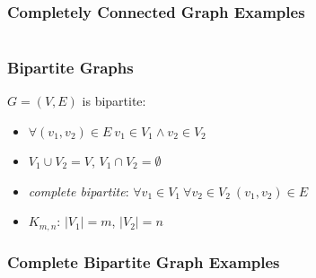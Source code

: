 \documentclass[dvipsnames]{beamer}
\begin{document}
\begin{frame}
  \frametitle{Completely Connected Graph Examples}

  \begin{columns}
    \begin{example}[$K_4$]
      \begin{center}
      \end{center}
    \end{example}

    \begin{example}[$K_5$]
      \begin{center}
      \end{center}
    \end{example}
  \end{columns}
\end{frame}

\begin{frame}
  \frametitle{Bipartite Graphs}

  \begin{definition}
    $G=(V,E)$ is \alert{bipartite}:
    \begin{itemize}
      \item $\forall (v_1,v_2) \in E~v_1 \in V_1 \wedge v_2 \in V_2$
      \item $V_1 \cup V_2 = V$, $V_1 \cap V_2 = \emptyset$
    \end{itemize}
  \end{definition}

  \pause
  \begin{itemize}
    \item \emph{complete bipartite}:
      $\forall v_1 \in V_1~\forall v_2 \in V_2~(v_1,v_2) \in E$
    \item $K_{m,n}$: $|V_1|=m$, $|V_2|=n$
  \end{itemize}
\end{frame}

\begin{frame}
  \frametitle{Complete Bipartite Graph Examples}

  \begin{columns}[t]
    \begin{example}[$K_{2,3}$]
      \begin{center}
      \end{center}
    \end{example}

    \begin{example}[$K_{3,3}$]
      \begin{center}
      \end{center}
    \end{example}
  \end{columns}
\end{frame}
\end{document}
